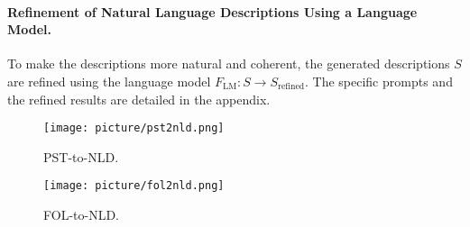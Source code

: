     
\paragraph{Refinement of Natural Language Descriptions Using a Language Model.}
    To make the descriptions more natural and coherent, the generated descriptions \( S \) are refined using the language model \( F_{\text{LM}}: S \rightarrow S_{\text{refined}} \). The specific prompts and the refined results are detailed in the appendix. 

\begin{figure}
\centering
\vspace{0.1in}
\texttt{[image: picture/pst2nld.png]}
\vspace{0.1in}
\caption{ PST-to-NLD.}
\label{fig:pst2nld}
\vspace{0.1in}
\end{figure}

\begin{figure}
\centering
\vspace{0.1in}
\texttt{[image: picture/fol2nld.png]}
\vspace{0.1in}
\caption{ FOL-to-NLD.}
\label{fig:fol2nld}
\vspace{0.1in}
\end{figure}

